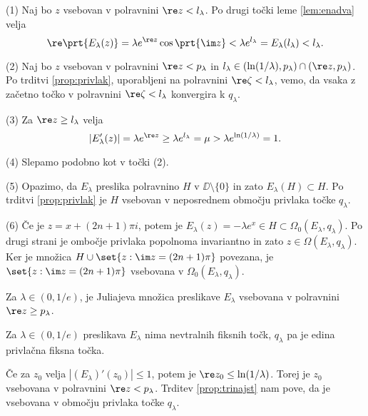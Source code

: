 \begin{dokaz}
    (1) Naj bo \(z\) vsebovan v polravnini \(\re z < l_\lambda\). Po drugi točki leme \ref{lem:enadva} velja
    \[\re \prt{E_\lambda (z)} = \lambda e^{\re z} \cos \prt{\im z} < \lambda e^{l_\lambda} = E_\lambda (l_\lambda) < l_\lambda.\]

    (2) Naj bo \(z\) vsebovan v polravnini \(\re z < p_\lambda\) in \(l_\lambda \in (\ln (1 / \lambda), p_\lambda) \cap (\re z, p_\lambda)\). Po trditvi \ref{prop:privlak}, uporabljeni na polravnini \(\re \zeta < l_\lambda\), vemo, da vsaka z začetno točko v polravnini \(\re \zeta < l_\lambda\) konvergira k \(q_\lambda\).

    (3) Za \(\re z \geq l_\lambda\) velja
    \[|E_\lambda' (z)| = \lambda e^{\re z} \geq \lambda e^{l_\lambda} = \mu > \lambda e^{\ln (1 / \lambda)} = 1.\]

    (4) Slepamo podobno kot v točki (2).

    (5) Opazimo, da \(E_\lambda\) preslika polravnino \(H\) v \(\DD \setminus \{0\}\) in zato \(E_\lambda (H) \subset H\). Po trditvi \ref{prop:privlak} je \(H\) vsebovan v neposrednem območju privlaka točke \(q_\lambda\).

    (6) Če je \(z = x + (2n + 1) \pi i\), potem je \(E_\lambda (z) = - \lambda e^x \in H \subset \Omega_0 (E_\lambda, q_\lambda)\). Po drugi strani je ombočje privlaka popolnoma invariantno in zato \(z \in \Omega (E_\lambda, q_\lambda)\). Ker je množica \(H \cup \set{z : \im z = (2n + 1) \pi}\) povezana, je \(\set{z : \im z = (2n + 1) \pi}\) vsebovana v \(\Omega_0 (E_\lambda, q_\lambda)\).
\end{dokaz}

\begin{posledica} \label{cor:jul-e}
    Za \(\lambda \in (0, 1/e)\), je Juliajeva množica preslikave \(E_\lambda\) vsebovana v polravnini \(\re z \geq p_\lambda\).
\end{posledica}

\begin{posledica}
    Za \(\lambda \in (0, 1/e)\) preslikava \(E_\lambda\) nima nevtralnih fiksnih točk, \(q_\lambda\) pa je edina privlačna fiksna točka.
\end{posledica}

\begin{dokaz}
    Če za \(z_0\) velja \(|(E_\lambda)' (z_0)| \leq 1\), potem je \(\re z_0 \leq \ln (1 / \lambda)\). Torej je \(z_0\) vsebovana v polravnini \(\re z < p_\lambda\). Trditev \ref{prop:trinajst} nam pove, da je vsebovana v območju privlaka točke \(q_\lambda\).
\end{dokaz}


